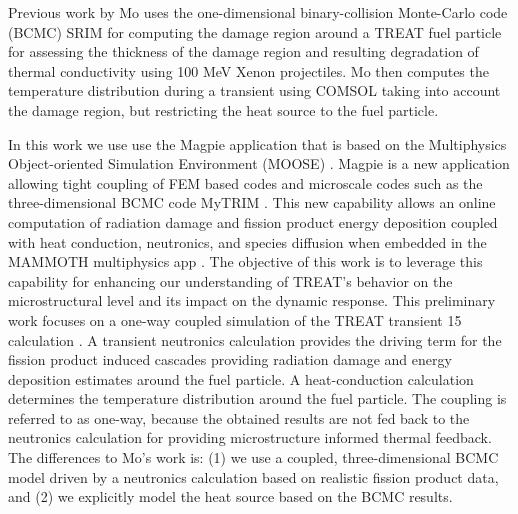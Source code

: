 \documentclass{anstrans}
\begin{document}
Previous work by Mo \cite{Mo2015} uses the one-dimensional binary-collision Monte-Carlo code (BCMC) SRIM \cite{SRIM} for computing the damage region around a TREAT fuel particle for assessing the thickness of the damage region and resulting degradation of thermal conductivity using 100 MeV Xenon projectiles. Mo then computes the temperature distribution during a transient using COMSOL \cite{COMSOL} taking into account the damage region, but restricting the heat source to the fuel particle.

In this work we use use the Magpie application that is based on the Multiphysics Object-oriented Simulation Environment (MOOSE) \cite{Moose}. Magpie is a new application allowing tight coupling of FEM based codes and microscale codes such as the three-dimensional BCMC code MyTRIM \cite{MyTRIM}. This new capability allows an online computation of radiation damage and fission product energy deposition coupled with heat conduction, neutronics, and species diffusion when embedded in the MAMMOTH multiphysics app \cite{MAMMOTH}. The objective of this work is to leverage this capability for enhancing our understanding of TREAT's behavior on the microstructural level and its impact on the dynamic response. This preliminary work focuses on a one-way coupled simulation of the TREAT transient 15 calculation \cite{DeHart2016}. A transient neutronics calculation provides the driving term for the fission product induced cascades providing radiation damage and energy deposition estimates around the fuel particle. A heat-conduction calculation determines the temperature distribution around the fuel particle. The coupling is referred to as one-way, because the obtained results are not fed back to the neutronics calculation for providing microstructure informed thermal feedback. The differences to Mo's work is: (1) we use a coupled, three-dimensional BCMC model driven by a neutronics calculation based on realistic fission product data, and (2) we explicitly model the heat source based on the BCMC results. 

\end{document}
